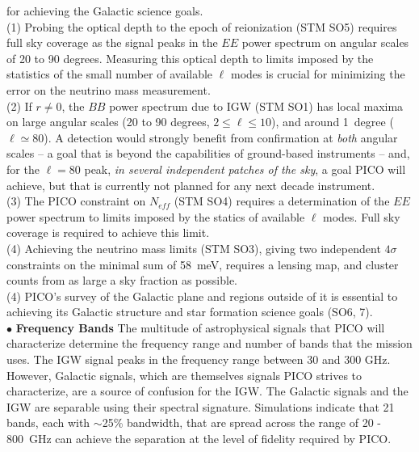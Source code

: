 \documentclass[PICOReport.tex]{subfiles}
\begin{document}
for achieving the Galactic science goals. \\
(1) Probing the optical depth to the epoch of reionization (STM SO5) requires full sky 
coverage as the signal peaks in the $EE$ power spectrum on angular scales of 20 to 90 degrees. Measuring 
this optical depth to limits imposed by the statistics of the small number of available $\ell$ modes is crucial 
for minimizing the error on the neutrino mass measurement. \\   
(2) If $r \ne 0 $, the $BB$ power spectrum due to IGW (STM SO1) has local maxima on large angular scales
(20 to 90 degrees, $ 2 \leq \ell \leq 10$), and around 1~degree ($ \ell \simeq 80$). 
A detection would strongly benefit from confirmation at {\it both} angular 
scales -- a goal that is beyond the capabilities of ground-based instruments -- and, for the $\ell = 80$ peak, 
{\it in several independent patches of the sky}, a goal PICO will achieve, but that is currently not planned for 
any next decade instrument.  \\
(3) The PICO constraint on $N_{eff}$ (STM SO4) requires a determination of the $EE$ power spectrum to limits
imposed by the statics of available $\ell$ modes. Full sky coverage is required to achieve this limit.  \\
(4) Achieving the neutrino mass limits (STM SO3), giving two independent $4\sigma$ constraints on the minimal sum of 58~meV, requires
a lensing map, and cluster counts from as large a sky fraction as possible. \\
(4) PICO's survey of the Galactic plane and regions outside of it is essential to achieving its Galactic structure 
and star formation science goals (SO6, 7). \\
%
$\bullet$ {\bf Frequency Bands} \hspace{0.1in} The multitude of astrophysical signals that PICO will characterize 
determine the frequency range and number of bands that the mission uses. The \ac{IGW} signal peaks 
in the frequency range between 30 and 300 GHz. However, Galactic signals, which are themselves signals PICO strives to 
characterize, are a source of confusion for the IGW. The Galactic signals and the IGW are separable using their 
spectral signature. Simulations indicate that 21 bands, each with $\sim$25\% bandwidth, that are spread across 
the range of 20 - 800~GHz can achieve the separation at the level of fidelity required by PICO. 
\end{document}

